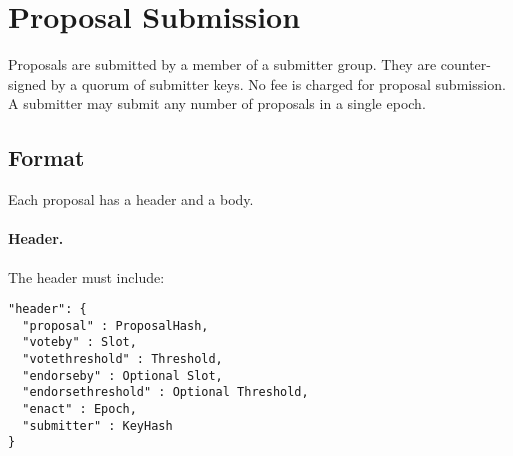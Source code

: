 \newpage
\section{Proposal Submission}
\label{sect:submission}

Proposals are submitted by a member of a submitter group.  They are counter-signed by a quorum of submitter keys.
No fee is charged for proposal submission.
A submitter may submit any number of proposals in a single epoch.

\subsection{Format}

Each proposal has a header and a body.  %

\paragraph{Header.} The header must include:

\begin{verbatim}
"header": {
  "proposal" : ProposalHash,
  "voteby" : Slot,
  "votethreshold" : Threshold,
  "endorseby" : Optional Slot,
  "endorsethreshold" : Optional Threshold,
  "enact" : Epoch,
  "submitter" : KeyHash
}
\end{verbatim}

